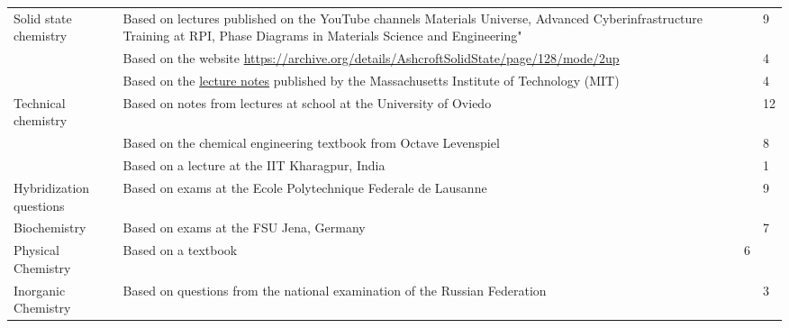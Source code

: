 \begin{xltabular}{\textwidth}{p{3.5 cm}p{6.5 cm}p{.5cm}X}
\midrule
Solid state chemistry & Based on lectures published on the YouTube channels Materials Universe, Advanced Cyberinfrastructure Training at RPI, Phase Diagrams in Materials Science and Engineering" && 9\\
                    & Based on the website \href{Wayback Machine}{https://archive.org/details/AshcroftSolidState/page/128/mode/2up} && 4\\
                    & Based on the \href{https://ocw.mit.edu/courses/3-091sc-introduction-to-solid-state-chemistry-fall-2010/pages/organic-materials/29-polymers-synthesis-properties-applications/}{lecture notes} published by the Massachusetts Institute of Technology (MIT) && 4\\
Technical chemistry & Based on notes from lectures at school at the University of Oviedo && 12\\
                    & Based on the chemical engineering textbook from Octave Levenspiel && 8\\
                    & Based on a lecture at the IIT Kharagpur, India && 1\\
\midrule
Hybridization questions &  Based on exams at the Ecole Polytechnique Federale de Lausanne && 9\\
\midrule
Biochemistry & Based on exams at the FSU Jena, Germany && 7\\
\midrule
Physical Chemistry & Based on a textbook & 6\\
\midrule Inorganic Chemistry & Based on questions from the national examination of the Russian Federation && 3\\
\bottomrule
\end{xltabular}
